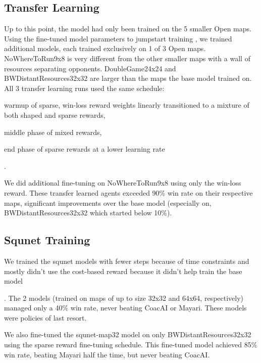 \documentclass[conference]{IEEEtran}
\newif\ifsupplemental
\newcommand{\supptableref}[1]{%
  \ifsupplemental
    \ (Supplemental Table~\ref{#1})%
  \fi
}
\newcommand{\mapname}[1]{#1} %
\begin{document}
\subsection{Transfer Learning}
Up to this point, the model had only been trained on the 5 smaller Open maps. Using the
fine-tuned model parameters to jumpstart training \cite{DBLP:books/sp/12/Lazaric12}, we
trained additional models, each trained exclusively on 1 of 3 Open maps.
\mapname{NoWhereToRun9x8} is very different from the other smaller maps with a wall of
resources separating opponents. \mapname{DoubleGame24x24} and
\mapname{BWDistantResources32x32} are larger than the maps the base model trained on.
All 3 transfer learning runs used the same schedule:
\begin{inparaenum}[(1)]
    \item warmup of sparse, win-loss reward weights linearly transitioned to a mixture
    of both shaped and sparse rewards,
    \item middle phase of mixed rewards,
    \item end phase of sparse rewards at a lower learning rate\supptableref{tab:transfer-learning-schedule}.
\end{inparaenum}
We did additional fine-tuning on \mapname{NoWhereToRun9x8} using only the win-loss
reward. These transfer learned agents exceeded 90\% win rate on their respective maps,
significant improvements over the base model (especially on,
\mapname{BWDistantResources32x32} which started below 10\%).

\subsection{Squnet Training}
We trained the squnet models with fewer steps because of time constraints and mostly
didn't use the cost-based reward because it didn't help train the base
model\supptableref{tab:squnet-training-parameters}. The 2 models (trained on maps of up
to size 32x32 and 64x64, respectively) managed only a 40\% win rate, never beating
CoacAI or Mayari. These models were policies of last resort.

We also fine-tuned the squnet-map32 model on only \mapname{BWDistantResources32x32}
using the sparse reward fine-tuning schedule. This fine-tuned 
model achieved 85\% win rate, beating Mayari half the time, but never beating CoacAI.
\end{document}

